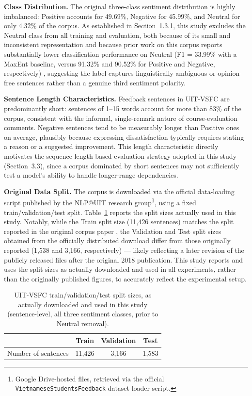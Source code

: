 \documentclass[12pt]{report} %
\begin{document}
\textbf{Class Distribution.} The original three-class sentiment distribution is highly imbalanced: Positive accounts for 49.69\%, Negative for 45.99\%, and Neutral for only 4.32\% of the corpus. As established in Section~1.3.1, this study excludes the Neutral class from all training and evaluation, both because of its small and inconsistent representation and because prior work on this corpus reports substantially lower classification performance on Neutral (F1 = 33.99\% with a MaxEnt baseline, versus 91.32\% and 90.52\% for Positive and Negative, respectively) \cite{nguyen2018uitvsfc}, suggesting the label captures linguistically ambiguous or opinion-free sentences rather than a genuine third sentiment polarity.

\textbf{Sentence Length Characteristics.} Feedback sentences in UIT-VSFC are predominantly short: sentences of 1--15 words account for more than 83\% of the corpus, consistent with the informal, single-remark nature of course-evaluation comments. Negative sentences tend to be measurably longer than Positive ones on average, plausibly because expressing dissatisfaction typically requires stating a reason or a suggested improvement. This length characteristic directly motivates the sequence-length-based evaluation strategy adopted in this study (Section~3.3), since a corpus dominated by short sentences may not sufficiently test a model's ability to handle longer-range dependencies.

\textbf{Original Data Split.} The corpus is downloaded via the official data-loading script published by the NLP@UIT research group\footnote{Google Drive-hosted files, retrieved via the official \texttt{VietnameseStudentsFeedback} dataset loader script.}, using a fixed train/validation/test split. Table~\ref{tab:uitvsfc-split} reports the split sizes actually used in this study. Notably, while the Train split size (11,426 sentences) matches the split reported in the original corpus paper \cite{nguyen2018uitvsfc}, the Validation and Test split sizes obtained from the officially distributed download differ from those originally reported (1,538 and 3,166, respectively) --- likely reflecting a later revision of the publicly released files after the original 2018 publication. This study reports and uses the split sizes as actually downloaded and used in all experiments, rather than the originally published figures, to accurately reflect the experimental setup.

\begin{table}[htbp]
    \centering
    \caption{UIT-VSFC train/validation/test split sizes, as actually downloaded and used in this study (sentence-level, all three sentiment classes, prior to Neutral removal).}
    \label{tab:uitvsfc-split}
    \begin{tabular}{lccc}
        \hline
                            & \textbf{Train} & \textbf{Validation} & \textbf{Test} \\
        \hline
        Number of sentences & 11,426         & 3,166               & 1,583         \\
        \hline
    \end{tabular}
\end{table}
\end{document}
